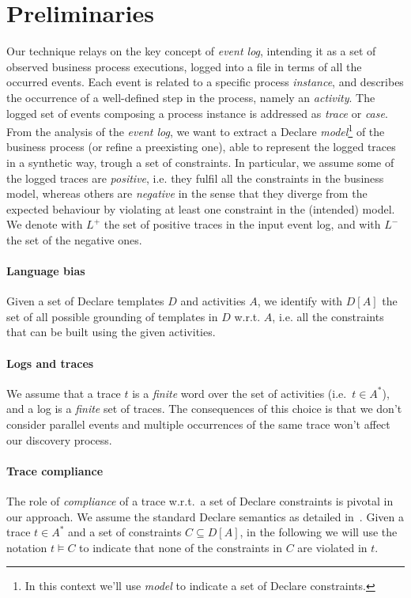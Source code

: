 \section{Preliminaries}
\label{sec:pre}

Our technique relays on the key concept of \emph{event log}, intending it as a set of observed business process executions, logged into a file in terms of all the occurred events. Each event is related to a specific process \emph{instance}, and describes the occurrence of a well-defined step in the process, namely an \emph{activity}. The logged set of events composing a process instance is addressed as \emph{trace} or \emph{case}. 
From the analysis of the \emph{event log}, we want to extract a Declare \cite{?} \emph{model}\footnote{In this context we'll use \emph{model} to indicate a set of Declare constraints.} of the business process (or refine a preexisting one), able to represent the logged traces in a synthetic way, trough a set of constraints.
In particular, we assume some of the logged traces are \emph{positive}, i.e. they fulfil all the constraints in the business model, whereas others are \emph{negative} in the sense that they diverge from the expected behaviour by violating at least one constraint in the (intended) model. 
We denote with $L^+$ the set of positive traces in the input event log, and with $L^-$ the set of the negative ones.

\paragraph{Language bias} Given a set of Declare templates $D$ and activities $A$, we identify with $D[A]$ the set of all possible grounding of templates in $D$ w.r.t. $A$, i.e. all the constraints that can be built using the given activities.

\paragraph{Logs and traces} We assume that a trace $t$ is a \emph{finite} word over the set of activities (i.e.\ $t\in A^*$), and a log is a \emph{finite} set of traces. The consequences of this choice is that we don't consider parallel events and multiple occurrences of the same trace won't affect our discovery process.

\paragraph{Trace compliance} The role of \emph{compliance} of a trace w.r.t.\ a set of Declare constraints is pivotal in our approach. We assume the standard Declare semantics as detailed in~\cite{???}. Given a trace $t\in A^*$ and a set of constraints $C\subseteq D[A]$, in the following we will use the notation $t\models C$ to indicate that none of the constraints in $C$ are violated in $t$.

